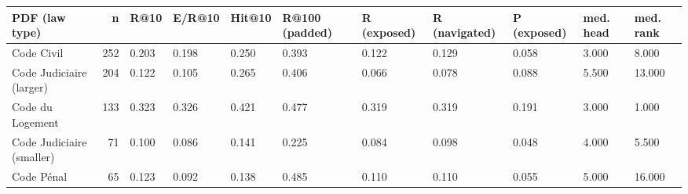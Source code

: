 \begin{tabular}{lrlllllllll}
\toprule
PDF (law type) & n & R@10 & E/R@10 & Hit@10 & R@100 (padded) & R (exposed) & R (navigated) & P (exposed) & med. head & med. rank \\
\midrule
Code Civil & 252 & 0.203 & 0.198 & 0.250 & 0.393 & 0.122 & 0.129 & 0.058 & 3.000 & 8.000 \\
Code Judiciaire (larger) & 204 & 0.122 & 0.105 & 0.265 & 0.406 & 0.066 & 0.078 & 0.088 & 5.500 & 13.000 \\
Code du Logement & 133 & 0.323 & 0.326 & 0.421 & 0.477 & 0.319 & 0.319 & 0.191 & 3.000 & 1.000 \\
Code Judiciaire (smaller) & 71 & 0.100 & 0.086 & 0.141 & 0.225 & 0.084 & 0.098 & 0.048 & 4.000 & 5.500 \\
Code Pénal & 65 & 0.123 & 0.092 & 0.138 & 0.485 & 0.110 & 0.110 & 0.055 & 5.000 & 16.000 \\
\bottomrule
\end{tabular}

